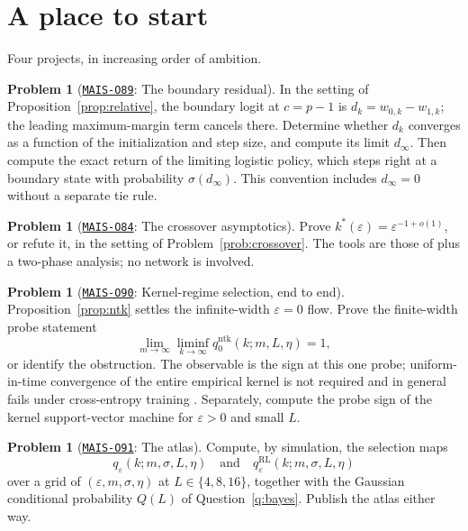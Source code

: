 \documentclass[11pt]{amsart}
\newcommand{\Oid}[1]{\href{https://github.com/lionellevine/MAIS/blob/main/open-problems/MAIS-O#1.md}{\texttt{MAIS-O#1}}}
\theoremstyle{plain}
\theoremstyle{definition}
\newtheorem{problem}[theorem]{Problem}
\begin{document}
\section{A place to start}\label{sec:start}

Four projects, in increasing order of ambition.

\begin{problem}[\Oid{89}: The boundary residual]\label{prob:boundary}
In the setting of Proposition~\ref{prop:relative}, the boundary logit at $c=p-1$ is $d_k=w_{0,k}-w_{1,k}$; the leading maximum-margin term cancels there. Determine whether $d_k$ converges as a function of the initialization and step size, and compute its limit $d_\infty$. Then compute the exact return of the limiting logistic policy, which steps right at a boundary state with probability $\sigma(d_\infty)$. This convention includes $d_\infty=0$ without a separate tie rule.
\end{problem}

\begin{problem}[\Oid{84}: The crossover asymptotics]
Prove $k^{*}(\varepsilon)=\varepsilon^{-1+o(1)}$, or refute it, in the setting of Problem~\ref{prob:crossover}. The tools are those of \cite{soudry2018} plus a two-phase analysis; no network is involved.
\end{problem}

\begin{problem}[\Oid{90}: Kernel-regime selection, end to end]\label{prob:ntkstarter}
Proposition~\ref{prop:ntk} settles the infinite-width $\varepsilon=0$ flow. Prove the finite-width probe statement
\[
\lim_{m\to\infty}\liminf_{k\to\infty}
q^{\mathrm{ntk}}_0(k;m,L,\eta)=1,
\]
or identify the obstruction. The observable is the sign at this one probe; uniform-in-time convergence of the entire empirical kernel is not required and in general fails under cross-entropy training \cite{yu2025}. Separately, compute the probe sign of the kernel support-vector machine for $\varepsilon>0$ and small $L$.
\end{problem}

\begin{problem}[\Oid{91}: The atlas]
Compute, by simulation, the selection maps
\[
q_\varepsilon(k;m,\sigma,L,\eta)
\quad\text{and}\quad
q^{\mathrm{RL}}_\varepsilon(k;m,\sigma,L,\eta)
\]
over a grid of $(\varepsilon,m,\sigma,\eta)$ at $L\in\{4,8,16\}$, together with the Gaussian conditional probability $Q(L)$ of Question~\ref{q:bayes}. Publish the atlas either way.
\end{problem}
\end{document}
